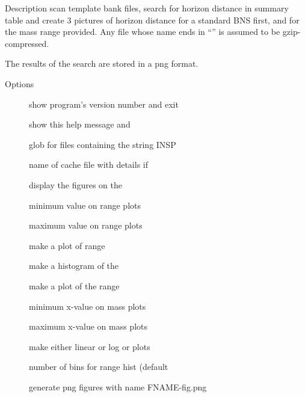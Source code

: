 \begin{manpage}{}


\begin{mansection}{Description}
 scan template bank files, 
search for horizon distance in summary table 
and create 3  pictures of horizon distance for a standard BNS first, and for
the mass range provided.  Any file whose name ends
in ``'' is assumed to be gzip-compressed.

The results of the search are  stored in a png format.
\end{mansection}


\begin{mansection}{Options}
\begin{description}
\item[] show program's version number and exit
\item[] show this help message and
\item[]     glob for files containing the string INSP
\item[]    name of cache file with details if
\item[] display the figures on the
\item[]     minimum value on range plots  
\item[]     maximum value on range plots  
\item[]  make a plot of range
\item[]  make a histogram of the
\item[]  make a plot of the range
\item[]  minimum x-value on mass plots 
\item[]  maximum x-value on mass plots 
\item[]    make either linear or log or plots
\item[]    number of bins for range hist (default
\item[]   generate png figures with name FNAME-fig.png 

\end{description}
\end{mansection}
\end{manpage}
